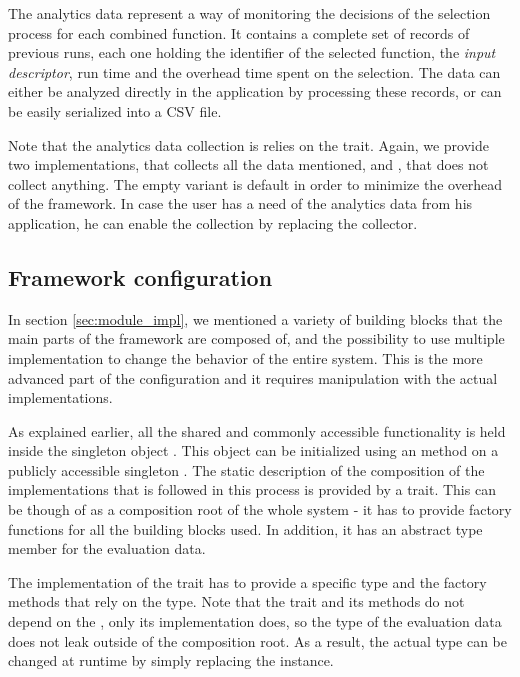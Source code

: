The analytics data represent a way of monitoring the decisions of the selection process for each combined function. It contains a complete set of records of previous runs, each one holding the identifier of the selected function, the \textit{input descriptor}, run time and the overhead time spent on the selection. The data can either be analyzed directly in the application by processing these records, or can be easily serialized into a CSV file.

Note that the analytics data collection is relies on the  trait. Again, we provide two implementations,  that collects all the data mentioned, and , that does not collect anything. The empty variant is default in order to minimize the overhead of the framework. In case the user has a need of the analytics data from his application, he can enable the collection by replacing the collector.

\subsection{Framework configuration}
\label{subsec:framework_config}

In section \ref{sec:module_impl}, we mentioned a variety of building blocks that the main parts of the framework are composed of, and the possibility to use multiple implementation to change the behavior of the entire system. This is the more advanced part of the configuration and it requires manipulation with the actual implementations.

As explained earlier, all the shared and commonly accessible functionality is held inside the singleton object . This object can be initialized using an  method on a publicly accessible singleton . The static description of the composition of the implementations that is followed in this process is provided by a  trait. This can be though of as a composition root of the whole system - it has to provide factory functions for all the building blocks used. In addition, it has an abstract type member  for the evaluation data. 


The implementation of the  trait has to provide a specific  type and the factory methods that rely on the type. Note that the  trait and its methods do not depend on the , only its implementation does, so the type of the evaluation data does not leak outside of the composition root. As a result, the actual type can be changed at runtime by simply replacing the  instance.

